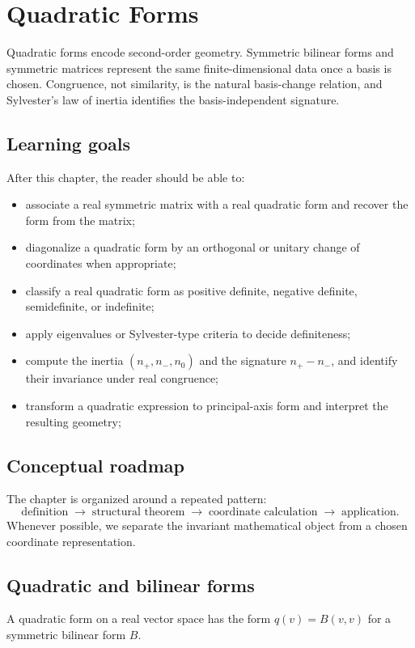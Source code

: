 \chapter{Quadratic Forms}
\label{ch:i17-quadratic-forms}

Quadratic forms encode second-order geometry. Symmetric bilinear forms and symmetric matrices represent the same finite-dimensional data once a basis is chosen. Congruence, not similarity, is the natural basis-change relation, and Sylvester's law of inertia identifies the basis-independent signature.

\section*{Learning goals}
After this chapter, the reader should be able to:
\begin{itemize}
\item associate a real symmetric matrix with a real quadratic form and recover the form from the matrix;
\item diagonalize a quadratic form by an orthogonal or unitary change of coordinates when appropriate;
\item classify a real quadratic form as positive definite, negative definite, semidefinite, or indefinite;
\item apply eigenvalues or Sylvester-type criteria to decide definiteness;
\item compute the inertia $(n_+,n_-,n_0)$ and the signature $n_+-n_-$, and identify their invariance under real congruence;
\item transform a quadratic expression to principal-axis form and interpret the resulting geometry;
\end{itemize}
\section*{Conceptual roadmap}
The chapter is organized around a repeated pattern:
\[
\boxed{\text{definition}\;\longrightarrow\;\text{structural theorem}\;\longrightarrow\;\text{coordinate calculation}\;\longrightarrow\;\text{application}.}
\]
Whenever possible, we separate the invariant mathematical object from a chosen coordinate representation.

\section{Quadratic and bilinear forms}
A quadratic form on a real vector space has the form $q(v)=B(v,v)$ for a symmetric bilinear form $B$.

